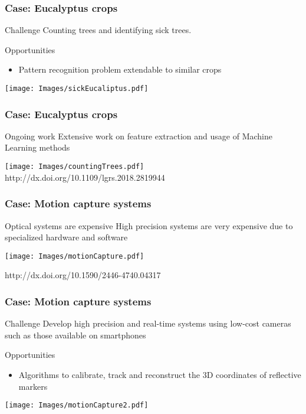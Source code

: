 \documentclass{beamer}
\begin{document}
\begin{frame}\frametitle{Case: Eucalyptus crops}
  \begin{block}{Challenge}
Counting trees and identifying sick trees. 
  \end{block}

	\begin{exampleblock}{Opportunities}
    \begin{itemize}
      \item Pattern recognition problem extendable to similar crops
    \end{itemize}
	\end{exampleblock}
  \centering
 \texttt{[image: Images/sickEucaliptus.pdf]}
\end{frame}

\begin{frame}\frametitle{Case: Eucalyptus crops}
	\begin{alertblock}{Ongoing work}
  Extensive work on feature extraction and usage of Machine Learning methods 
	\end{alertblock}

  \centering
    \texttt{[image: Images/countingTrees.pdf]}  
    http://dx.doi.org/10.1109/lgrs.2018.2819944
\end{frame}


\begin{frame}\frametitle{Case: Motion capture systems}
  \begin{alertblock}{Optical systems are expensive}
High precision systems are very expensive due to specialized hardware and software
  \end{alertblock}

  \centering
    \texttt{[image: Images/motionCapture.pdf]}  

    http://dx.doi.org/10.1590/2446-4740.04317
\end{frame}

\begin{frame}\frametitle{Case: Motion capture systems}
  \begin{block}{Challenge}
Develop high precision and real-time systems using low-cost cameras such as those available on smartphones
  \end{block}
	\begin{exampleblock}{Opportunities}
    \begin{itemize}
      \item Algorithms to calibrate, track and reconstruct the 3D coordinates of reflective markers 
    \end{itemize}
	\end{exampleblock}
  \centering
    \texttt{[image: Images/motionCapture2.pdf]} 

\end{frame}
\end{document}
